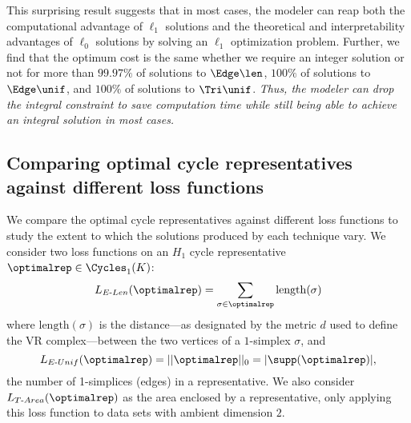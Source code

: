 This surprising result suggests that in most cases, the modeler can reap both the computational advantage of $\ell_1$ solutions and the theoretical and interpretability advantages of $\ell_0$ solutions by solving an $\ell_1$ optimization problem. Further, we find that the optimum cost is the same whether we require an integer solution or not for more than $99.97\%$ of solutions to \pr $\Edge\len$, $100\%$ of solutions to $\Edge\unif$, and $100\%$ of solutions to $\Tri\unif$. \emph{Thus, the modeler can drop the integral constraint to save computation time while still being able to achieve an integral solution in most cases.} %


\subsection{Comparing optimal cycle representatives against different loss functions}\label{sec:comparing optimal generators against different loss functions}

We compare the optimal cycle representatives against different loss functions to study the extent to which the solutions produced by each technique vary. We consider two loss functions on an $H_1$ cycle representative $\optimalrep \in \Cycles_1(K)$:
$$L_{E\text{-}Len}(\optimalrep) = \sum_{\sigma \in \optimalrep} \mathrm{length}(\sigma)$$
where $\mathrm{length}(\sigma)$ is the distance---as designated by the metric $d$ used to define the VR complex---between the two vertices of a $1$-simplex $\sigma$, and
$$L_{E\text{-}Unif}(\optimalrep) = ||\optimalrep||_0=|\supp(\optimalrep)|, $$ 
the number of 1-simplices (edges) in a representative. We also consider $L_{T\text{-}Area}(\optimalrep)$ as the area enclosed by a representative, only applying this loss function to data sets with ambient dimension $2$. 


